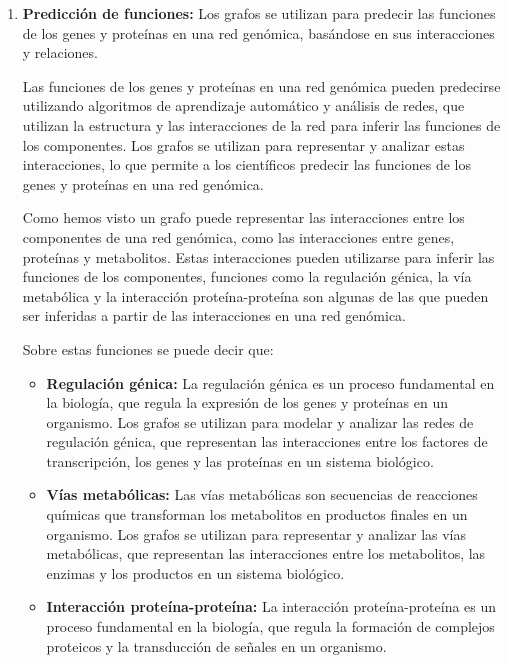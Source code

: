 \documentclass[11pt, a4paper]{article}
\begin{document}
\begin{enumerate}
    \item \textbf{Predicción de funciones:} Los grafos se utilizan para predecir las funciones de los genes y proteínas en una red genómica, basándose en sus interacciones y relaciones.
    
    Las funciones de los genes y proteínas en una red genómica pueden predecirse utilizando algoritmos de aprendizaje automático y análisis de redes, que utilizan la estructura y las interacciones de la red para inferir las funciones de los componentes. Los grafos se utilizan para representar y analizar estas interacciones, lo que permite a los científicos predecir las funciones de los genes y proteínas en una red genómica.

    Como hemos visto un grafo puede representar las interacciones entre los componentes de una red genómica, como las interacciones entre genes, proteínas y metabolitos. Estas interacciones pueden utilizarse para inferir las funciones de los componentes, funciones como la regulación génica, la vía metabólica y la interacción proteína-proteína son algunas de las que pueden ser inferidas a partir de las interacciones en una red genómica.

    Sobre estas funciones se puede decir que:

    \begin{itemize}
      \item \textbf{Regulación génica:} La regulación génica es un proceso fundamental en la biología, que regula la expresión de los genes y proteínas en un organismo. Los grafos se utilizan para modelar y analizar las redes de regulación génica, que representan las interacciones entre los factores de transcripción, los genes y las proteínas en un sistema biológico.
      
      \item \textbf{Vías metabólicas:} Las vías metabólicas son secuencias de reacciones químicas que transforman los metabolitos en productos finales en un organismo. Los grafos se utilizan para representar y analizar las vías metabólicas, que representan las interacciones entre los metabolitos, las enzimas y los productos en un sistema biológico.
      
      \item \textbf{Interacción proteína-proteína:} La interacción proteína-proteína es un proceso fundamental en la biología, que regula la formación de complejos proteicos y la transducción de señales en un organismo.
    \end{itemize}
  \end{enumerate}
  \newpage 
\end{document}
